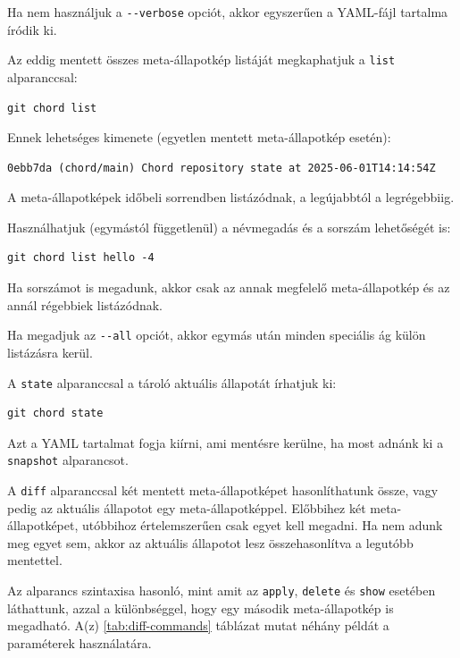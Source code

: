 \documentclass[
]{elteikthesis}[2025/03/25]
\begin{document}
Ha nem használjuk a \verb|--verbose| opciót, akkor egyszerűen a YAML-fájl tartalma íródik ki.

Az eddig mentett összes meta-állapotkép listáját megkaphatjuk a \verb|list| alparanccsal:

\begin{verbatim}
git chord list
\end{verbatim}

Ennek lehetséges kimenete (egyetlen mentett meta-állapotkép esetén):

\begin{verbatim}
0ebb7da (chord/main) Chord repository state at 2025-06-01T14:14:54Z
\end{verbatim}

A meta-állapotképek időbeli sorrendben listázódnak, a legújabbtól a legrégebbiig.

Használhatjuk (egymástól függetlenül) a névmegadás és a sorszám lehetőségét is:

\begin{verbatim}
git chord list hello -4
\end{verbatim}

Ha sorszámot is megadunk, akkor csak az annak megfelelő meta-állapotkép és az annál régebbiek listázódnak.

Ha megadjuk az \verb|--all| opciót, akkor egymás után minden speciális ág külön listázásra kerül.

A \verb|state| alparanccsal a tároló aktuális állapotát írhatjuk ki:

\begin{verbatim}
git chord state
\end{verbatim}

Azt a YAML tartalmat fogja kiírni, ami mentésre kerülne, ha most adnánk ki a \verb|snapshot| alparancsot.

A \verb|diff| alparanccsal két mentett meta-állapotképet hasonlíthatunk össze,
vagy pedig az aktuális állapotot egy meta-állapotképpel.
Előbbihez két meta-állapotképet, utóbbihoz értelemszerűen csak egyet kell megadni.
Ha nem adunk meg egyet sem,
akkor az aktuális állapotot lesz összehasonlítva a legutóbb mentettel.

Az alparancs szintaxisa hasonló, mint amit az \verb|apply|, \verb|delete| és \verb|show|
esetében láthattunk,
azzal a különbséggel, hogy egy második meta-állapotkép is megadható.
A(z) \ref{tab:diff-commands} táblázat mutat néhány példát a paraméterek használatára.
\end{document}
